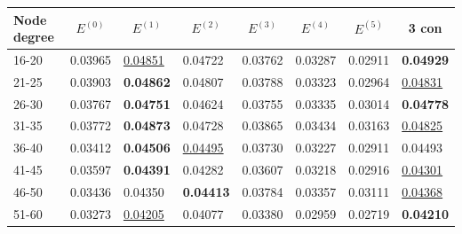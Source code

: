 \begin{table}[]
    \centering
    \begin{tabular}{|l|l|l|l|l|l|l||l|}
        \hline
        Node degree & \multicolumn{1}{c|}{$E^{(0)}$} & \multicolumn{1}{c|}{$E^{(1)}$} & \multicolumn{1}{c|}{$E^{(2)}$} & \multicolumn{1}{c|}{$E^{(3)}$} & \multicolumn{1}{c|}{$E^{(4)}$} & \multicolumn{1}{c|}{$E^{(5)}$} & \multicolumn{1}{c|}{3 con} \\ \hline
        16-20       & 0.03965                        & \underline{0.04851}            & 0.04722                        & 0.03762                        & 0.03287                        & 0.02911                        & \textbf{0.04929}           \\ \hline
        21-25       & 0.03903                        & \textbf{0.04862}               & 0.04807                        & 0.03788                        & 0.03323                        & 0.02964                        & \underline{0.04831}        \\ \hline
        26-30       & 0.03767                        & \textbf{0.04751}               & 0.04624                        & 0.03755                        & 0.03335                        & 0.03014                        & \textbf{0.04778}           \\ \hline
        31-35       & 0.03772                        & \textbf{0.04873}               & 0.04728                        & 0.03865                        & 0.03434                        & 0.03163                        & \underline{0.04825}        \\ \hline
        36-40       & 0.03412                        & \textbf{0.04506}               & \underline{0.04495}            & 0.03730                        & 0.03227                        & 0.02911                        & 0.04493                    \\ \hline
        41-45       & 0.03597                        & \textbf{0.04391}               & 0.04282                        & 0.03607                        & 0.03218                        & 0.02916                        & \underline{0.04301}        \\ \hline
        46-50       & 0.03436                        & 0.04350                        & \textbf{0.04413}               & 0.03784                        & 0.03357                        & 0.03111                        & \underline{0.04368}        \\ \hline
        51-60       & 0.03273                        & \underline{0.04205}            & 0.04077                        & 0.03380                        & 0.02959                        & 0.02719                        & \textbf{0.04210}           \\ \hline

\end{tabular}
\end{table}

